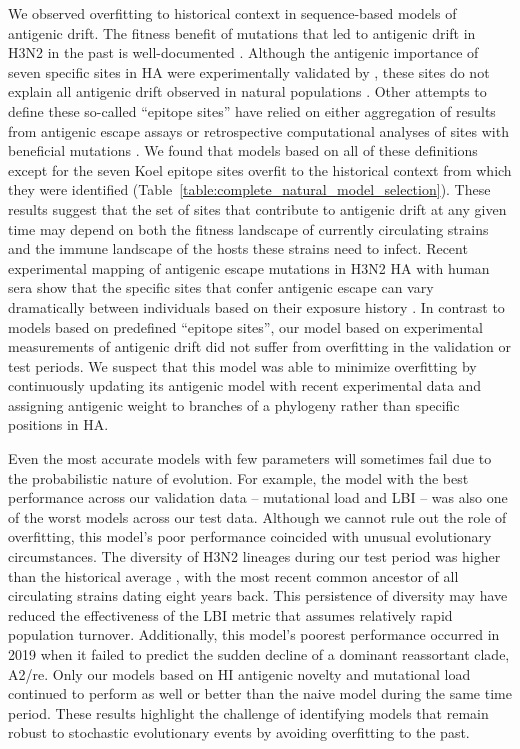 We observed overfitting to historical context in sequence-based models of antigenic drift.
The fitness benefit of mutations that led to antigenic drift in H3N2 in the past is well-documented \citep{Wiley:1981bc,Smith:2004jc,Wolf:2006da,Koel:2013jz}.
Although the antigenic importance of seven specific sites in HA were experimentally validated by \cite{Koel:2013jz}, these sites do not explain all antigenic drift observed in natural populations \citep{Neher:2016hy}.
Other attempts to define these so-called ``epitope sites'' have relied on either aggregation of results from antigenic escape assays \citep{Wolf:2006da} or retrospective computational analyses of sites with beneficial mutations \citep{Shih:2007bd,Luksza:2014hj}.
We found that models based on all of these definitions except for the seven Koel epitope sites overfit to the historical context from which they were identified (Table~\ref{table:complete_natural_model_selection}).
These results suggest that the set of sites that contribute to antigenic drift at any given time may depend on both the fitness landscape of currently circulating strains and the immune landscape of the hosts these strains need to infect.
Recent experimental mapping of antigenic escape mutations in H3N2 HA with human sera show that the specific sites that confer antigenic escape can vary dramatically between individuals based on their exposure history \citep{Lee2019}.
In contrast to models based on predefined ``epitope sites'', our model based on experimental measurements of antigenic drift did not suffer from overfitting in the validation or test periods.
We suspect that this model was able to minimize overfitting by continuously updating its antigenic model with recent experimental data and assigning antigenic weight to branches of a phylogeny rather than specific positions in HA.

Even the most accurate models with few parameters will sometimes fail due to the probabilistic nature of evolution.
For example, the model with the best performance across our validation data -- mutational load and LBI -- was also one of the worst models across our test data.
Although we cannot rule out the role of overfitting, this model's poor performance coincided with unusual evolutionary circumstances.
The diversity of H3N2 lineages during our test period was higher than the historical average \citep{Koelle:2006kf}, with the most recent common ancestor of all circulating strains dating eight years back.
This persistence of diversity may have reduced the effectiveness of the LBI metric that assumes relatively rapid population turnover.
Additionally, this model's poorest performance occurred in 2019 when it failed to predict the sudden decline of a dominant reassortant clade, A2/re.
Only our models based on HI antigenic novelty and mutational load continued to perform as well or better than the naive model during the same time period.
These results highlight the challenge of identifying models that remain robust to stochastic evolutionary events by avoiding overfitting to the past.

